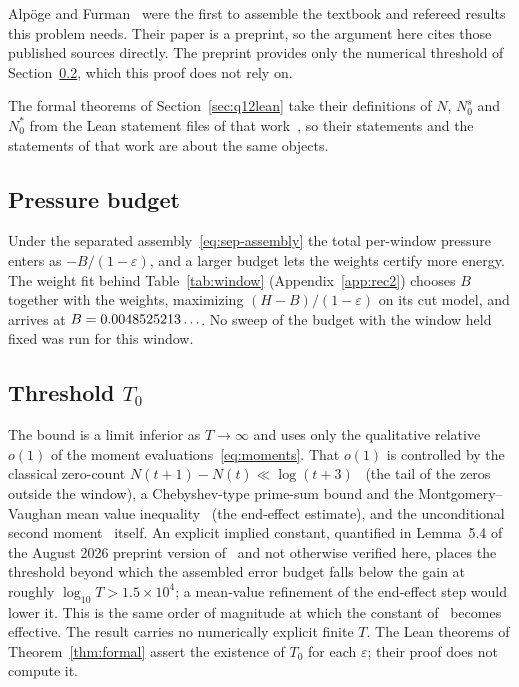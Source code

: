 \documentclass[11pt]{article}
\theoremstyle{definition}
\newcommand{\eps}{\varepsilon}
\begin{document}
Alp\"oge and Furman~\cite{AF26} were the first to assemble the textbook and
refereed results this problem needs. Their paper is a preprint, so the
argument here cites those published sources directly. The preprint provides
only the numerical threshold of Section~\ref{sec:threshold}, which this proof
does not rely on.

The formal theorems of Section~\ref{sec:q12lean} take
their definitions of $N$, $N_0^s$ and $N_0^*$ from the Lean statement files
of that work~\cite{Zeta23Lean}, so their statements and the statements of
that work are about the same objects.

\subsection{Pressure budget}\label{sec:budget}
Under the separated assembly~\eqref{eq:sep-assembly} the total per-window
pressure enters as $-B/(1-\eps)$, and a larger budget lets the weights certify
more energy. The weight fit behind Table~\ref{tab:window}
(Appendix~\ref{app:rec2}) chooses $B$ together with the weights, maximizing
$(H-B)/(1-\eps)$ on its cut model, and arrives at $B=0.0048525213\ldots$. No sweep of
the budget with the window held fixed was run for this window.

\subsection{Threshold $T_0$}\label{sec:threshold}
The bound is a limit inferior as $T\to\infty$ and uses only the qualitative relative
$o(1)$ of the moment evaluations~\eqref{eq:moments}. That $o(1)$ is controlled by
the classical zero-count $N(t+1)-N(t)\ll\log(t+3)$~\cite{Tit86} (the tail of the
zeros outside the window), a Chebyshev-type prime-sum bound and the
Montgomery--Vaughan mean value inequality~\cite{MV07} (the end-effect estimate),
and the unconditional second moment~\cite{BGSTB24} itself. An explicit implied
constant, quantified in Lemma~5.4 of the August 2026 preprint version
of~\cite{AF26} and not otherwise verified here, places the threshold beyond
which the assembled error budget falls below the gain at roughly
$\log_{10}T>1.5\times10^4$; a mean-value refinement of the end-effect step would
lower it. This is the same order of magnitude at which the constant of~\cite{AF26}
becomes effective. The result carries no numerically explicit finite $T$.
The Lean theorems of Theorem~\ref{thm:formal} assert the existence of $T_0$
for each $\eps$; their proof does not compute it.
\end{document}
